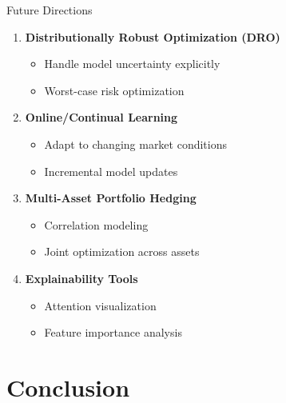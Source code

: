 \documentclass[aspectratio=169,11pt]{beamer}
\begin{document}
\begin{frame}{Future Directions}
\begin{enumerate}
    \item \textbf{Distributionally Robust Optimization (DRO)}
    \begin{itemize}
        \item Handle model uncertainty explicitly
        \item Worst-case risk optimization
    \end{itemize}
    
    \vspace{0.2cm}
    \item \textbf{Online/Continual Learning}
    \begin{itemize}
        \item Adapt to changing market conditions
        \item Incremental model updates
    \end{itemize}
    
    \vspace{0.2cm}
    \item \textbf{Multi-Asset Portfolio Hedging}
    \begin{itemize}
        \item Correlation modeling
        \item Joint optimization across assets
    \end{itemize}
    
    \vspace{0.2cm}
    \item \textbf{Explainability Tools}
    \begin{itemize}
        \item Attention visualization
        \item Feature importance analysis
    \end{itemize}
\end{enumerate}
\end{frame}

\section{Conclusion}
\end{document}
